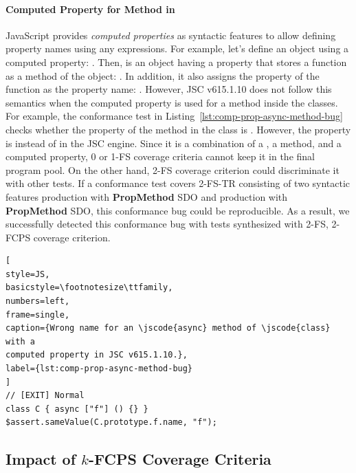 \paragraph{\textbf{Computed Property for  Method in
}}
%
JavaScript provides \textit{computed properties} as syntactic features to
allow defining property names using any expressions.
%
For example, let's define an object using a computed property: .
%
Then,  is an object having a property  that stores a
function as a method of the object: .
%
In addition, it also assigns the  property of the function as the
property name: .
%
However, JSC v615.1.10 does not follow this semantics when the computed property
is used for a  method inside the classes.
%
For example, the conformance test in
Listing~\ref{lst:comp-prop-async-method-bug} checks whether the 
property of the  method in the class  is .
%
However, the  property is  instead of 
in the JSC engine.
%
Since it is a combination of a , a  method, and a
computed property, 0 or 1-FS coverage criteria cannot keep it in the final
program pool.
%
On the other hand, 2-FS coverage criterion could discriminate it with other
tests.
%
If a conformance test covers 2-FS-TR consisting of two syntactic features
 production with \textbf{PropMethod} SDO and
 production with \textbf{PropMethod} SDO, this
conformance bug could be reproducible.
%
As a result, we successfully detected this conformance bug with tests
synthesized with 2-FS, 2-FCPS coverage criterion.
\begin{lstlisting}[
style=JS,
basicstyle=\footnotesize\ttfamily,
numbers=left,
frame=single,
caption={Wrong name for an \jscode{async} method of \jscode{class} with a
computed property in JSC v615.1.10.},
label={lst:comp-prop-async-method-bug}
]
// [EXIT] Normal
class C { async ["f"] () {} }
$assert.sameValue(C.prototype.f.name, "f");
\end{lstlisting}


\subsection{Impact of $k$-FCPS Coverage Criteria}\label{sec:impact-k-fcps}

